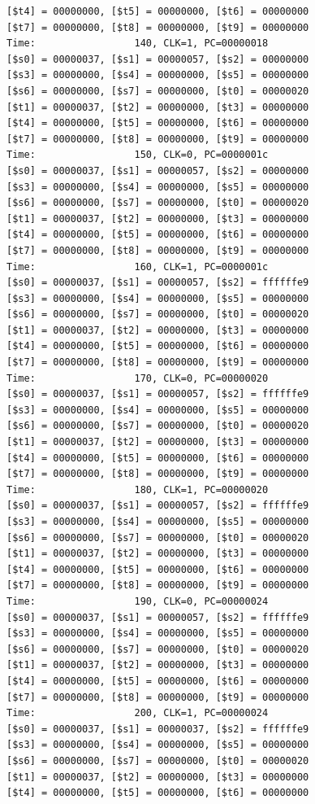 \documentclass[a4paper,12pt]{article}
\begin{document}
\begin{lstlisting}
[$t4] = 00000000, [$t5] = 00000000, [$t6] = 00000000
[$t7] = 00000000, [$t8] = 00000000, [$t9] = 00000000
Time:                 140, CLK=1, PC=00000018
[$s0] = 00000037, [$s1] = 00000057, [$s2] = 00000000
[$s3] = 00000000, [$s4] = 00000000, [$s5] = 00000000
[$s6] = 00000000, [$s7] = 00000000, [$t0] = 00000020
[$t1] = 00000037, [$t2] = 00000000, [$t3] = 00000000
[$t4] = 00000000, [$t5] = 00000000, [$t6] = 00000000
[$t7] = 00000000, [$t8] = 00000000, [$t9] = 00000000
Time:                 150, CLK=0, PC=0000001c
[$s0] = 00000037, [$s1] = 00000057, [$s2] = 00000000
[$s3] = 00000000, [$s4] = 00000000, [$s5] = 00000000
[$s6] = 00000000, [$s7] = 00000000, [$t0] = 00000020
[$t1] = 00000037, [$t2] = 00000000, [$t3] = 00000000
[$t4] = 00000000, [$t5] = 00000000, [$t6] = 00000000
[$t7] = 00000000, [$t8] = 00000000, [$t9] = 00000000
Time:                 160, CLK=1, PC=0000001c
[$s0] = 00000037, [$s1] = 00000057, [$s2] = ffffffe9
[$s3] = 00000000, [$s4] = 00000000, [$s5] = 00000000
[$s6] = 00000000, [$s7] = 00000000, [$t0] = 00000020
[$t1] = 00000037, [$t2] = 00000000, [$t3] = 00000000
[$t4] = 00000000, [$t5] = 00000000, [$t6] = 00000000
[$t7] = 00000000, [$t8] = 00000000, [$t9] = 00000000
Time:                 170, CLK=0, PC=00000020
[$s0] = 00000037, [$s1] = 00000057, [$s2] = ffffffe9
[$s3] = 00000000, [$s4] = 00000000, [$s5] = 00000000
[$s6] = 00000000, [$s7] = 00000000, [$t0] = 00000020
[$t1] = 00000037, [$t2] = 00000000, [$t3] = 00000000
[$t4] = 00000000, [$t5] = 00000000, [$t6] = 00000000
[$t7] = 00000000, [$t8] = 00000000, [$t9] = 00000000
Time:                 180, CLK=1, PC=00000020
[$s0] = 00000037, [$s1] = 00000057, [$s2] = ffffffe9
[$s3] = 00000000, [$s4] = 00000000, [$s5] = 00000000
[$s6] = 00000000, [$s7] = 00000000, [$t0] = 00000020
[$t1] = 00000037, [$t2] = 00000000, [$t3] = 00000000
[$t4] = 00000000, [$t5] = 00000000, [$t6] = 00000000
[$t7] = 00000000, [$t8] = 00000000, [$t9] = 00000000
Time:                 190, CLK=0, PC=00000024
[$s0] = 00000037, [$s1] = 00000057, [$s2] = ffffffe9
[$s3] = 00000000, [$s4] = 00000000, [$s5] = 00000000
[$s6] = 00000000, [$s7] = 00000000, [$t0] = 00000020
[$t1] = 00000037, [$t2] = 00000000, [$t3] = 00000000
[$t4] = 00000000, [$t5] = 00000000, [$t6] = 00000000
[$t7] = 00000000, [$t8] = 00000000, [$t9] = 00000000
Time:                 200, CLK=1, PC=00000024
[$s0] = 00000037, [$s1] = 00000037, [$s2] = ffffffe9
[$s3] = 00000000, [$s4] = 00000000, [$s5] = 00000000
[$s6] = 00000000, [$s7] = 00000000, [$t0] = 00000020
[$t1] = 00000037, [$t2] = 00000000, [$t3] = 00000000
[$t4] = 00000000, [$t5] = 00000000, [$t6] = 00000000

\end{lstlisting}
\end{document}
